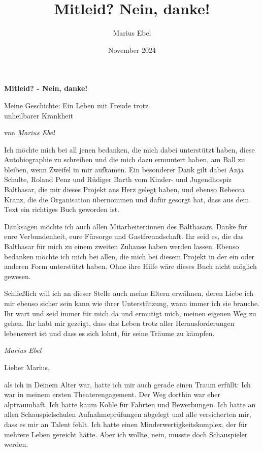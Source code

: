 \documentclass[fontsize=14pt,a4paper,headinclude,DIV=calc,automark]{scrbook}
\title{Mitleid? Nein, danke!}
\author{Marius Ebel}
\date{November 2024}
\begin{document}
\frontmatter

\thispagestyle{empty}

\vspace*{\fill}
\begin{center}
    \huge\bfseries Mitleid? - Nein, danke!\par
    \vspace{1cm}
    \large Meine Geschichte: Ein Leben mit Freude trotz\\ unheilbarer Krankheit\par
    \vspace{1cm}
    \normalsize von \textit{Marius Ebel}\par
\end{center}
\vspace*{\fill}

\pagestyle{plain}

Ich möchte mich bei all jenen bedanken, die mich dabei unterstützt haben, diese Autobiographie zu schreiben und die mich dazu ermuntert haben, am Ball zu bleiben, wenn Zweifel in mir aufkamen.
Ein besonderer Dank gilt dabei Anja Schulte, Roland Penz und Rüdiger Barth vom Kinder- und Jugendhospiz Balthasar, die mir dieses Projekt ans Herz gelegt haben, und ebenso Rebecca Kranz, die die Organisation übernommen und dafür gesorgt hat, dass aus dem Text ein richtiges Buch geworden ist.

Danksagen möchte ich auch allen Mitarbeiter:innen des Balthasars. Danke für eure Verbundenheit, eure Fürsorge und Gastfreundschaft. Ihr seid es, die das Balthasar für mich zu einem zweiten Zuhause haben werden lassen.
Ebenso bedanken möchte ich mich bei allen, die mich bei diesem Projekt in der ein oder anderen Form unterstützt haben. Ohne ihre Hilfe wäre dieses Buch nicht möglich gewesen.

Schließlich will ich an dieser Stelle auch meine Eltern erwähnen, deren Liebe ich mir ebenso sicher sein kann wie ihrer Unterstützung, wann immer ich sie brauche. Ihr wart und seid immer für mich da und ermutigt mich, meinen eigenen Weg zu gehen. Ihr habt mir gezeigt, dass das Leben trotz aller Herausforderungen lebenswert ist und dass es sich lohnt, für seine Träume zu kämpfen.

\vspace{0.5cm}
\noindent\textit{Marius Ebel}

Lieber Marius,\par
\vspace*{0.5\baselineskip}
\noindent als ich in Deinem Alter war, hatte ich mir auch gerade einen Traum erfüllt: Ich war in meinem ersten Theaterengagement.
Der Weg dorthin war eher alptraumhaft. Ich hatte kaum Kohle für Fahrten und Bewerbungen. Ich hatte an allen Schauspielschulen Aufnahmeprüfungen abgelegt und alle versicherten mir, dass es mir an Talent fehlt. Ich hatte einen Minderwertigkeitskomplex, der für mehrere Leben gereicht hätte.
Aber ich wollte, nein, musste doch Schauspieler werden.
\end{document}
